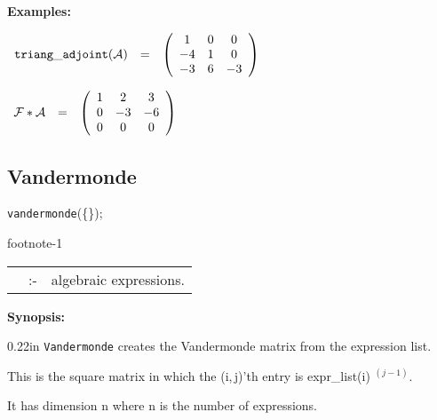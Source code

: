 {\bf Examples:}

\begin{flushleft}
\hspace*{0.1in}
\begin{math}
\begin{array}{ccc}
{\tt triang\_adjoint}({\cal A}) & = &
\left( \begin{array}{ccc} 1 & 0 & 0 \\ -4 & 1 & 0 \\ -3 & 6 & -3
\end{array} \right)
\end{array}
\end{math}
\end{flushleft}

\vspace*{0.1in}

\begin{flushleft}
\hspace*{0.1in}
\begin{math}
\begin{array}{ccc}
{\cal F} * {\cal A} & = &
\left( \begin{array}{ccc} 1 & 2 & 3 \\ 0 & -3 & -6 \\ 0 & 0 & 0
\end{array} \right)
\end{array}
\end{math}
\end{flushleft}

\subsection{Vandermonde}


\hspace*{0.175in} {\tt vandermonde}(\{\exprlist{}\}); \addtocounter
{footnote}{-1}\footnotemark

\hspace*{0.1in} 
\begin{tabular}{l l l}
\exprlist{} &:-& algebraic expressions.
\end{tabular}

{\bf Synopsis:} %

\begin{addtolength}{\leftskip}{0.22in}
{\tt Vandermonde} creates the Vandermonde matrix from
                the expression list. 

This is the square matrix in which
                the (i,$\,$j)'th entry is expr\_list(i) $^{(j-1)}$.

It has dimension n where n is the number of expressions.

\end{addtolength}

